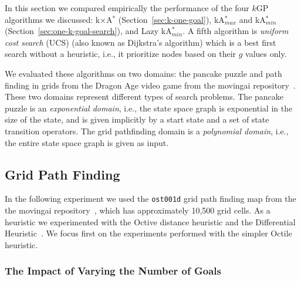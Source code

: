 \documentclass{aicom2e}
\newcommand{\kgs}{$k$GP}
\newcommand{\astar}{A$^*$}
\newcommand{\kastar}{kA$^*$}
\newcommand{\kastarmin}{kA$^*_{min}$}
\newcommand{\kastarmax}{kA$^*_{max}$}
\newcommand{\kxastar}{k$\times$A$^*$}
\newcommand{\minf}{$F_{min}(n)$}
\newcommand{\roni}[1]{\textbf{[RS:#1]}}
\begin{document}

In this section we compared empirically the performance of the four \kgs{}
algorithms we discussed: \kxastar{} (Section~\ref{sec:k-one-goal}),
\kastarmax{} and \kastarmin{}(Section~\ref{sec:one-k-goal-search}), and Lazy
\kastarmin{}. A fifth algorithm is {\em uniform cost search} (UCS) (also known
as Dijkstra's algorithm) which is a best first search without a heuristic,
i.e., it prioritize nodes based on their $g$ values only.


We evaluated these algorithms on two domains: the pancake puzzle and path
finding in grids from the Dragon Age video game from the movingai
repository~\cite{sturtevant2012benchmarks}. These two domains represent
different types of search problems. The pancake puzzle is an {\em exponential
domain}, i.e., the state space graph is exponential in the size of the state,
and is given implicitly by a start state and a set of state transition
operators. The grid pathfinding domain is a {\em polynomial domain}, i.e., the 
entire state space graph is given as input. %

\subsection{Grid Path Finding}


In the following experiment we used the {\tt ost001d} grid path finding map from the
the movingai repository~\cite{sturtevant2012benchmarks}, which has approximately 10,500 grid cells. 
As a heuristic we experimented with the Octive distance heuristic and the Differential Heuristic~\cite{goldberg2005computing,ng2002predicting,sturtevant2009memory}. We focus first on the experiments performed with the simpler Octile heuristic.  

\subsubsection{The Impact of Varying the Number of Goals}
\end{document}
